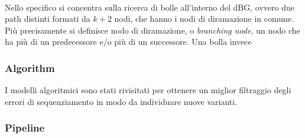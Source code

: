 \documentclass[../main.tex]{subfiles}
\begin{document}
\paragraph{}
Nello specifico si concentra sulla ricerca di bolle all'interno del dBG, ovvero due path distinti formati da $k+2$ nodi, che hanno i nodi di diramazione in comune. Più precisamente si definisce nodo di diramazione, o \textit{branching node}, un nodo che ha più di un predecessore e/o più di un successore. Una bolla invece

\subsubsection{Algorithm}

I modelli algoritmici sono stati rivisitati per ottenere un miglior filtraggio degli errori di sequenziamento in modo da individuare nuove varianti.

\subsubsection{Pipeline}
\end{document}
